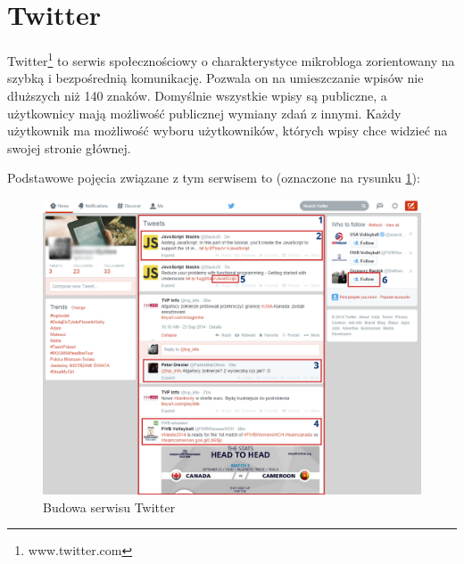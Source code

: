 \clearpage\section{Twitter}
Twitter\footnote{www.twitter.com} to serwis społecznościowy o charakterystyce mikrobloga zorientowany
na szybką i bezpośrednią komunikację. Pozwala on
na umieszczanie wpisów nie dłuższych niż 140 znaków. Domyślnie wszystkie 
wpisy są publiczne, a użytkownicy mają możliwość publicznej wymiany zdań
z innymi. Każdy użytkownik ma możliwość wyboru użytkowników, których
wpisy chce widzieć na swojej stronie głównej.

Podstawowe pojęcia związane z tym serwisem to (oznaczone na rysunku \ref{image:twitter-screen}):

\begin{figure}[ht!]
\centering
\includegraphics[width=160mm]{img/twitter-screen2.png}
\caption{Budowa serwisu Twitter}
\label{image:twitter-screen}
\end{figure}

